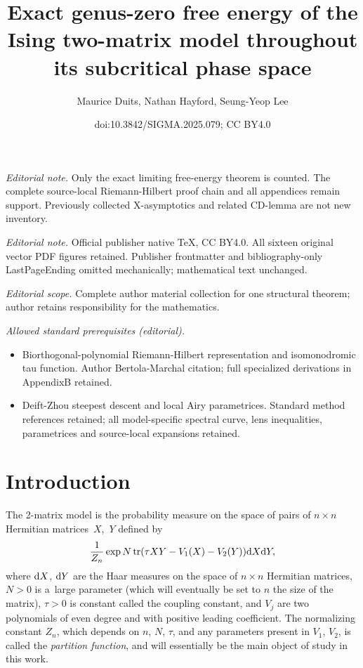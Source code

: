 \documentclass[10pt,a4paper]{amsart}
\title{Exact genus-zero free energy of the Ising two-matrix model throughout its subcritical phase space}
\author{Maurice Duits, Nathan Hayford, Seung-Yeop Lee}
\date{doi:10.3842/SIGMA.2025.079; CC BY4.0}
\DeclareMathOperator{\tr}{tr}
\numberwithin{equation}{section}
\begin{document}
\maketitle
\noindent\textit{Editorial note.} Only the exact limiting free-energy theorem is counted. The complete source-local Riemann-Hilbert proof chain and all appendices remain support. Previously collected X-asymptotics and related CD-lemma are not new inventory.\par\medskip
\noindent\textit{Editorial note.} Official publisher native TeX, CC BY4.0. All sixteen original vector PDF figures retained. Publisher frontmatter and bibliography-only LastPageEnding omitted mechanically; mathematical text unchanged.\par\medskip
\noindent\textit{Editorial scope.} Complete author material collection for one structural theorem; author retains responsibility for the mathematics.\par\medskip
\noindent\textit{Allowed standard prerequisites (editorial).}\begin{itemize}
\item Biorthogonal-polynomial Riemann-Hilbert representation and isomonodromic tau function. Author Bertola-Marchal citation; full specialized derivations in AppendixB retained.
\item Deift-Zhou steepest descent and local Airy parametrices. Standard method references retained; all model-specific spectral curve, lens inequalities, parametrices and source-local expansions retained.
\end{itemize}\medskip
\section{Introduction}

The 2-matrix model is the probability measure on the space of pairs of $n \times n$ Hermitian matrices~$X$,~$Y$ defined by
\begin{equation} \label{eq:twomatrixmodel}
 \frac{1}{Z_{n}} \exp N \tr (\tau X Y- V_1(X) -V_2(Y) ) {\rm d}X {\rm d}Y,
\end{equation}
where ${\rm d}X$, ${\rm d}Y$ are the Haar measures on the space of $n\times n$ Hermitian matrices, $N>0$ is a~large parameter (which will eventually be set to $n$ the size of the matrix), $\tau>0$ is constant called the coupling constant, and $V_j$ are two polynomials of even degree and with positive leading coefficient. The normalizing constant $Z_{n}$, which depends on $n$, $N$, $\tau$, and any parameters present in $V_1$, $V_2$, is called the \textit{partition function}, and will essentially be the main object of study in this work.
\end{document}
